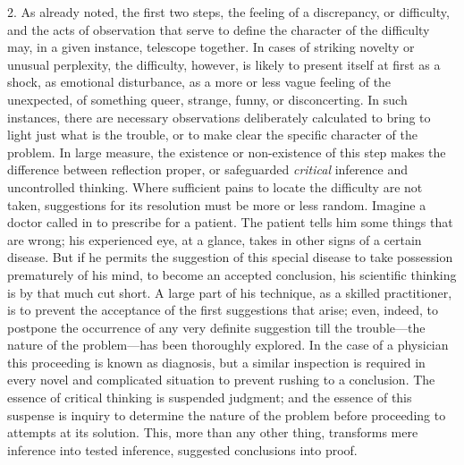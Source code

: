 \documentclass[showtrims,ustradepaper]{memoir}
\begin{document}
2. As already noted, the first two steps, the feeling of a discrepancy,
or difficulty, and the acts of observation that serve to define the
character of the difficulty may, in a given instance, telescope
together. In cases of striking novelty or unusual perplexity, the
difficulty, however, is likely to present itself at first as a shock,
as
emotional disturbance, as a more or less vague feeling of the
unexpected, of something queer, strange, funny, or disconcerting. In
such instances, there are necessary observations deliberately calculated
to bring to light just what is the trouble, or to make clear the
specific character of the problem. In large measure, the existence or
non-existence of this step makes the difference between reflection
proper, or safeguarded \emph{critical} inference and uncontrolled
thinking. Where sufficient pains to locate the difficulty are not taken,
suggestions for its resolution must be more or less random. Imagine a
doctor called in to prescribe for a patient. The patient tells him some
things that are wrong; his experienced eye, at a glance, takes in other
signs of a certain disease. But if he permits the suggestion of this
special disease to take possession prematurely of his mind, to become an
accepted conclusion, his scientific thinking is by that much cut short.
A large part of his technique, as a skilled practitioner, is to prevent
the acceptance of the first suggestions that arise; even, indeed, to
postpone the occurrence of any very definite suggestion till the
trouble---the nature of the problem---has been thoroughly explored. In
the case of a physician this proceeding is known as diagnosis, but a
similar inspection is required in every novel and complicated situation
to prevent rushing to a conclusion. The essence of critical thinking is
suspended judgment; and the essence of this suspense is inquiry to
determine the nature of the problem before proceeding to attempts at its
solution. This, more than any other thing, transforms mere inference
into tested inference, suggested conclusions into proof.

\end{document}

